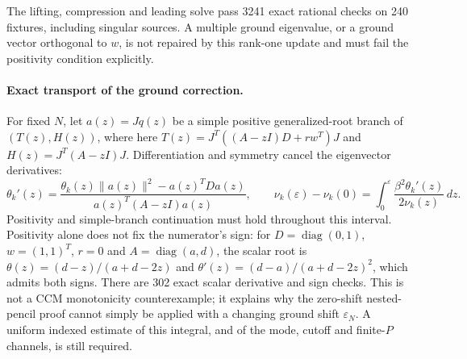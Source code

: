 The lifting, compression and leading solve pass 3241 exact rational
checks on 240 fixtures, including singular sources. A multiple ground
eigenvalue, or a ground vector orthogonal to $w$, is not repaired by
this rank-one update and must fail the positivity condition explicitly.



\paragraph{Exact transport of the ground correction.}
For fixed $N$, let $a(z)=Jq(z)$ be a simple positive generalized-root
branch of $(T(z),H(z))$, where here
$T(z)=J^T((A-zI)D+rw^T)J$ and $H(z)=J^T(A-zI)J$.
Differentiation and symmetry cancel the eigenvector derivatives:
\[
 \theta_k'(z)=
 \frac{\theta_k(z)\|a(z)\|^2-a(z)^TDa(z)}
 {a(z)^T(A-zI)a(z)},\qquad
 \nu_k(\varepsilon)-\nu_k(0)
 =\int_0^\varepsilon\frac{\beta^2\theta_k'(z)}{2\nu_k(z)}\,dz.
\]
Positivity and simple-branch continuation must hold throughout this
interval. Positivity alone does not fix the numerator's sign: for
$D=\operatorname{diag}(0,1)$, $w=(1,1)^T$, $r=0$ and
$A=\operatorname{diag}(a,d)$, the scalar root is
$\theta(z)=(d-z)/(a+d-2z)$ and
$\theta'(z)=(d-a)/(a+d-2z)^2$, which admits both signs.
There are 302 exact scalar derivative and sign checks. This is not
a CCM monotonicity counterexample; it explains why the zero-shift
nested-pencil proof cannot simply be applied with a changing ground
shift $\varepsilon_N$. A uniform indexed estimate of this integral,
and of the mode, cutoff and finite-$P$ channels, is still required.
